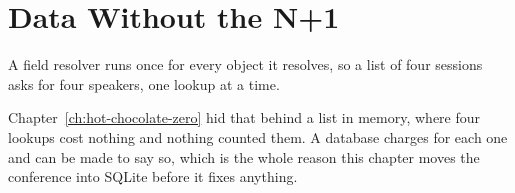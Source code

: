 \chapter{Data Without the N+1}
\label{ch:data-without-n-plus-1}

A field resolver runs once for every object it resolves, so a list of four
sessions asks for four speakers, one lookup at a time.

Chapter~\ref{ch:hot-chocolate-zero} hid that behind a list in memory, where
four lookups cost nothing and nothing counted them. A database charges for
each one and can be made to say so, which is the whole reason this chapter
moves the conference into SQLite before it fixes anything.







